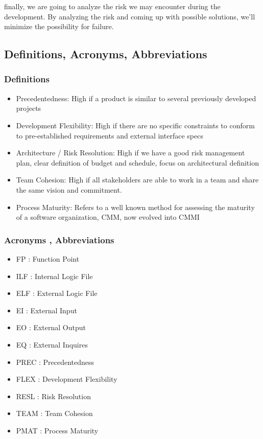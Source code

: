 \documentclass{article}
\begin{document}
finally, we are going to analyze the risk we may encounter during the development. By analyzing the risk and coming up with possible solutions, we'll minimize the possibility for failure.
\subsection{Definitions, Acronyms, Abbreviations}
	\subsubsection{Definitions}
	\begin{itemize}
		\item Precedentedness: High if a product is similar to several previously developed projects
		\item Development Flexibility: High if there are no specific constraints to conform to pre-established requirements and external interface specs
		\item Architecture / Risk Resolution: High if we have a good risk management plan, clear definition of budget and schedule, focus on architectural definition
		\item Team Cohesion: High if all stakeholders are able to work in a team and share the same vision and commitment.
		\item Process Maturity: Refers to a well known method for assessing the maturity of a software organization, CMM, now evolved into CMMI 
	\end{itemize}
	\subsubsection{Acronyms , Abbreviations}
	\begin{itemize}
		\item FP : Function Point
		\item ILF : Internal Logic File
		\item ELF : External Logic File
		\item EI : External Input
		\item EO : External Output
		\item EQ : External Inquires
		\item PREC : Precedentedness
		\item FLEX : Development Flexibility 
		\item RESL : Risk Resolution
		\item TEAM : Team Cohesion
		\item PMAT : Process Maturity
	\end{itemize}
\end{document}
